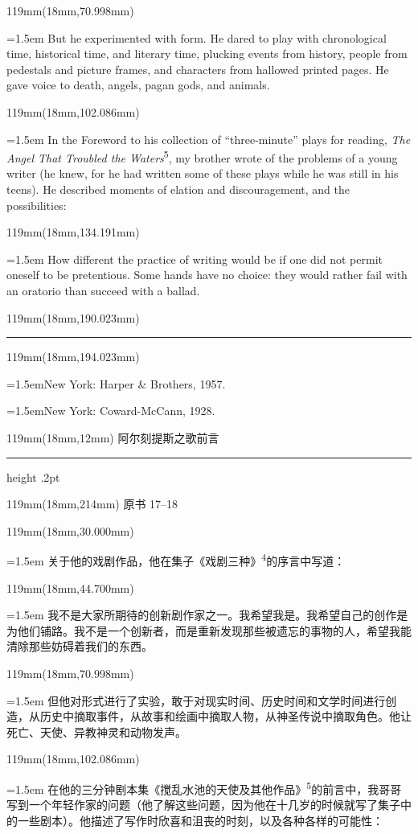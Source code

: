 \documentclass{article}
\newcommand{\ENsetup}{\normalfont\color{ink}\fontsize{11}{16.5}\selectfont\emergencystretch=1.5em}
\newcommand{\ZHsetup}{\normalfont\color{ink}\fontsize{10.5}{17}\selectfont\emergencystretch=1.5em}
\newcommand{\Note}[2]{\par\hangindent=1.5em\hangafter=1\noindent\makebox[1.5em][l]{#1}#2\par}
\newcommand{\Block}[3]{\begin{textblock*}{119mm}(18mm,#1mm){#2 #3\par}\end{textblock*}}
\newcommand{\Heading}[3]{%
  \begin{textblock*}{119mm}(18mm,12mm)
    \color{quiet}\fontsize{7.5}{10}\selectfont
    #1\hfill #2\par\vspace{3mm}\hrule height .2pt
  \end{textblock*}
  \begin{textblock*}{119mm}(18mm,214mm)
    \color{quiet}\fontsize{7}{10}\selectfont #3\hfill\thepage
  \end{textblock*}
}
\begin{document}
\Block{70.998}{\ENsetup}{But he experimented with form. He dared to play with chronological time, historical time, and literary time, plucking events from history, people from pedestals and picture frames, and characters from hallowed printed pages. He gave voice to death, angels, pagan gods, and animals.\par}
\Block{102.086}{\ENsetup}{In the Foreword to his collection of ``three-minute'' plays for reading, \textit{The Angel That Troubled the Waters}\textsuperscript{5}, my brother wrote of the problems of a young writer (he knew, for he had written some of these plays while he was still in his teens). He described moments of elation and discouragement, and the possibilities:\par}
\Block{134.191}{\ENsetup}{\leftskip=4mm\rightskip=3mm 
How different the practice of writing would be if one did not permit oneself to be pretentious. Some hands have no choice: they would rather fail with an oratorio than succeed with a ballad.\par}
\begin{textblock*}{119mm}(18mm,190.023mm)\color{ink}\rule{30mm}{.25pt}\end{textblock*}
\begin{textblock*}{119mm}(18mm,194.023mm)\normalfont\color{ink}\fontsize{7.5}{11}\selectfont \Note{4}{New York: Harper \& Brothers, 1957.}\vspace{1.5mm}\Note{5}{New York: Coward-McCann, 1928.}\end{textblock*}
\newpage
\null
\Heading{阿尔刻提斯之歌}{前言}{原书 17–18}
\Block{30.000}{\ZHsetup}{关于他的戏剧作品，他在集子《戏剧三种》\textsuperscript{4}的序言中写道：\par }
\Block{44.700}{\ZHsetup}{\leftskip=4mm\rightskip=3mm\kai 我不是大家所期待的创新剧作家之一。我希望我是。我希望自己的创作是为他们铺路。我不是一个创新者，而是重新发现那些被遗忘的事物的人，希望我能清除那些妨碍着我们的东西。\par }
\Block{70.998}{\ZHsetup}{但他对形式进行了实验，敢于对现实时间、历史时间和文学时间进行创造，从历史中摘取事件，从故事和绘画中摘取人物，从神圣传说中摘取角色。他让死亡、天使、异教神灵和动物发声。\par }
\Block{102.086}{\ZHsetup}{在他的三分钟剧本集《搅乱水池的天使及其他作品》\textsuperscript{5}的前言中，我哥哥写到一个年轻作家的问题{\kai （他了解这些问题，因为他在十几岁的时候就写了集子中的一些剧本）}。他描述了写作时欣喜和沮丧的时刻，以及各种各样的可能性：\par }
\end{document}
